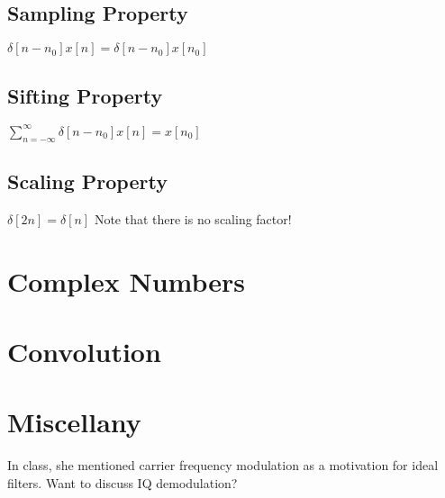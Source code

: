 \documentclass[11pt]{article}
\begin{document}
\subsection{Sampling Property}
$\delta[n-n_0]x[n] = \delta[n-n_0]x[n_0]$

\subsection{Sifting Property}
$\sum\limits_{n=-\infty}^\infty \delta[n-n_0]x[n] = x[n_0]$

\subsection{Scaling Property}
$\delta[2n]=\delta[n]$ Note that there is no scaling factor!

\section{Complex Numbers}

\section{Convolution}

\section{Miscellany}

In class, she mentioned carrier frequency modulation as a motivation for ideal filters. Want to discuss IQ demodulation?
\end{document}
